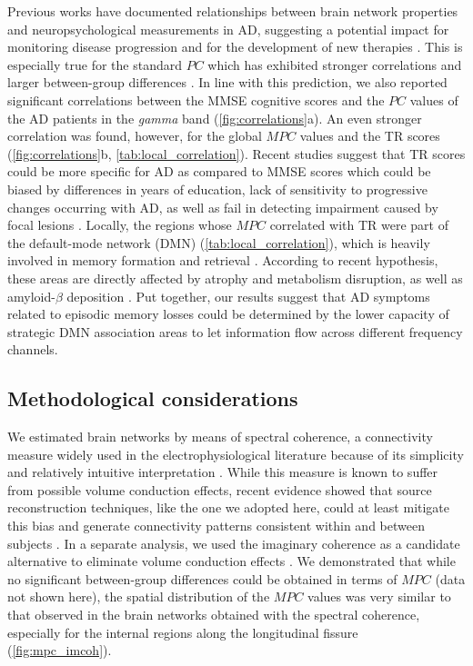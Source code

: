 Previous works have documented relationships between brain network properties and neuropsychological measurements in AD, suggesting a potential impact for monitoring disease progression and for the development of new therapies
\citep{de_haan_functional_2009,lo_diffusion_2010,sanz-arigita_loss_2010-1,shu_disrupted_2012,stam_small-world_2007,wang_disrupted_2013}.
This is especially true for the standard $PC$ which has exhibited stronger correlations and larger between-group differences \citep{tijms_alzheimers_2013}.
In line with this prediction, we also reported significant correlations between the MMSE cognitive scores and the $PC$ values of the AD patients in the \textit{gamma} band (\autoref{fig:correlations}a).
%
An even stronger correlation was found, however, for the global $MPC$ values and the TR scores (\autoref{fig:correlations}b, \autoref{tab:local_correlation}).
Recent studies suggest that TR scores could be more specific for AD \citep{grober_free_2010, velayudhan_review_2014} as compared to MMSE scores which could be biased by differences in years of education, lack of sensitivity to progressive changes occurring with AD, as well as fail in detecting impairment caused by focal lesions \citep{tombaugh_mini-mental_1992}.
Locally, the regions whose $MPC$ correlated with TR were part of the default-mode network (DMN) (\autoref{tab:local_correlation}), which is heavily involved in memory formation and retrieval \citep{buckner_brains_2008,sperling_functional_2010}. According to recent hypothesis, these areas are directly affected by atrophy and metabolism disruption, as well as amyloid-$\beta$ deposition \citep{buckner_molecular_2005, greicius_default-mode_2004}.
Put together, our results suggest that AD symptoms related to episodic memory losses could be determined by the lower capacity of strategic DMN association areas to let information flow across different frequency channels.

\subsection*{Methodological considerations}

We estimated brain networks by means of spectral coherence, a connectivity measure widely used in the electrophysiological literature because of its simplicity and relatively intuitive interpretation \citep{srinivasan_eeg_2007}.
While this measure is known to suffer from possible volume conduction effects, recent evidence showed that source reconstruction techniques, like the one we adopted here, could at least mitigate this bias \citep{schoffelen_source_2009} and generate connectivity patterns consistent within and between subjects \citep{colclough_how_2016}.
In a separate analysis, we used the imaginary coherence as a candidate alternative to eliminate volume conduction effects \citep{nolte_identifying_2004}. We demonstrated that while no significant between-group differences could be obtained in terms of $MPC$ (data not shown here), the spatial distribution of the $MPC$ values was very similar to that observed in the brain networks obtained with the spectral coherence, especially for the internal regions along the longitudinal fissure (\autoref{fig:mpc_imcoh}).

